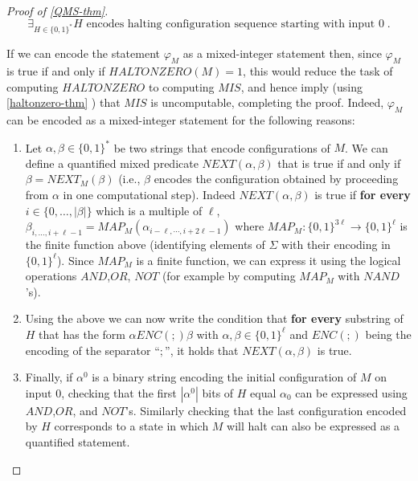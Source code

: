 \begin{proof}[Proof of \cref{QMS-thm}]
\[
\exists_{H \in \{0,1\}^*} \text{$H$ encodes halting configuration sequence starting with input $0$} \;.
\]

If we can encode the statement \(\varphi_M\) as a mixed-integer
statement then, since \(\varphi_M\) is true if and only if
\(\ensuremath{\mathit{HALTONZERO}}(M)=1\), this would reduce the task of
computing \(\ensuremath{\mathit{HALTONZERO}}\) to computing
\(\ensuremath{\mathit{MIS}}\), and hence imply (using
\cref{haltonzero-thm} ) that \(\ensuremath{\mathit{MIS}}\) is
uncomputable, completing the proof. Indeed, \(\varphi_M\) can be encoded
as a mixed-integer statement for the following reasons:

\begin{enumerate}
\def\labelenumi{\arabic{enumi}.}
\item
  Let \(\alpha,\beta \in \{0,1\}^*\) be two strings that encode
  configurations of \(M\). We can define a quantified mixed predicate
  \(\ensuremath{\mathit{NEXT}}(\alpha,\beta)\) that is true if and only
  if \(\beta = \ensuremath{\mathit{NEXT}}_M(\beta)\) (i.e., \(\beta\)
  encodes the configuration obtained by proceeding from \(\alpha\) in
  one computational step). Indeed
  \(\ensuremath{\mathit{NEXT}}(\alpha,\beta)\) is true if \textbf{for
  every} \(i \in \{0,\ldots,|\beta|\}\) which is a multiple of \(\ell\),
  \(\beta_{i,\ldots,i+\ell-1} = \ensuremath{\mathit{MAP}}_M(\alpha_{i-\ell,\cdots,i+2\ell-1})\)
  where
  \(\ensuremath{\mathit{MAP}}_M:\{0,1\}^{3\ell} \rightarrow \{0,1\}^\ell\)
  is the finite function above (identifying elements of \(\Sigma\) with
  their encoding in \(\{0,1\}^\ell\)). Since
  \(\ensuremath{\mathit{MAP}}_M\) is a finite function, we can express
  it using the logical operations
  \(\ensuremath{\mathit{AND}}\),\(\ensuremath{\mathit{OR}}\),
  \(\ensuremath{\mathit{NOT}}\) (for example by computing
  \(\ensuremath{\mathit{MAP}}_M\) with
  \(\ensuremath{\mathit{NAND}}\)'s).
\item
  Using the above we can now write the condition that \textbf{for every}
  substring of \(H\) that has the form
  \(\alpha \ensuremath{\mathit{ENC}}(;) \beta\) with
  \(\alpha,\beta \in \{0,1\}^\ell\) and \(\ensuremath{\mathit{ENC}}(;)\)
  being the encoding of the separator ``\(;\)'', it holds that
  \(\ensuremath{\mathit{NEXT}}(\alpha,\beta)\) is true.
\item
  Finally, if \(\alpha^0\) is a binary string encoding the initial
  configuration of \(M\) on input \(0\), checking that the first
  \(|\alpha^0|\) bits of \(H\) equal \(\alpha_0\) can be expressed using
  \(\ensuremath{\mathit{AND}}\),\(\ensuremath{\mathit{OR}}\), and
  \(\ensuremath{\mathit{NOT}}\)'s. Similarly checking that the last
  configuration encoded by \(H\) corresponds to a state in which \(M\)
  will halt can also be expressed as a quantified statement.
\end{enumerate}


\end{proof}
